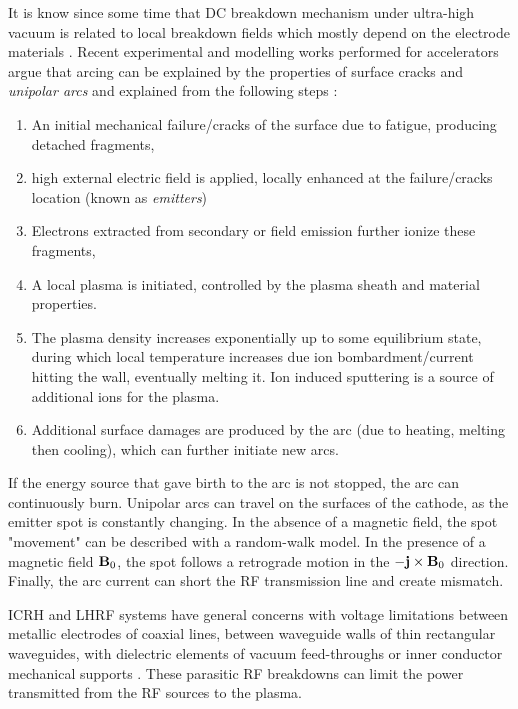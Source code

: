 It is know since some time that DC breakdown mechanism under ultra-high vacuum is related to local breakdown fields which mostly depend on the electrode materials . Recent experimental and modelling works performed for accelerators argue that arcing can be explained by the properties of surface cracks and \textit{unipolar arcs} and explained from the following steps :
\begin{enumerate}
\item An initial mechanical failure/cracks of the surface due to fatigue, producing detached fragments,
\item high external electric field is applied, locally enhanced at the failure/cracks location (known as \textit{emitters})
\item Electrons extracted from secondary or field emission further ionize these fragments,
\item A local plasma is initiated, controlled by the plasma sheath and material properties. 
\item The plasma density increases exponentially up to some equilibrium state, during which local temperature increases due ion bombardment/current hitting the wall, eventually melting it. Ion induced sputtering is a source of additional ions for the plasma.
\item Additional surface damages are produced by the arc (due to heating, melting then cooling), which can further initiate new arcs.
\end{enumerate}
If the energy source that gave birth to the arc is not stopped, the arc can continuously burn. Unipolar arcs can travel on the surfaces of the cathode, as the emitter spot is constantly changing. In the absence of a magnetic field, the spot "movement" can be described with a random-walk model. In the presence of a magnetic field ${\mathbf B}_0$, the spot follows a retrograde motion in the $-{\mathbf j}\times{\mathbf B}_0$ direction. Finally, the arc current can short the RF transmission line and create mismatch. 

ICRH and LHRF systems have general concerns with voltage limitations between metallic electrodes of coaxial lines, between waveguide walls of thin rectangular waveguides, with dielectric elements of vacuum feed-throughs or inner conductor mechanical supports . These parasitic RF breakdowns can limit the power transmitted from the RF sources to the plasma. 

